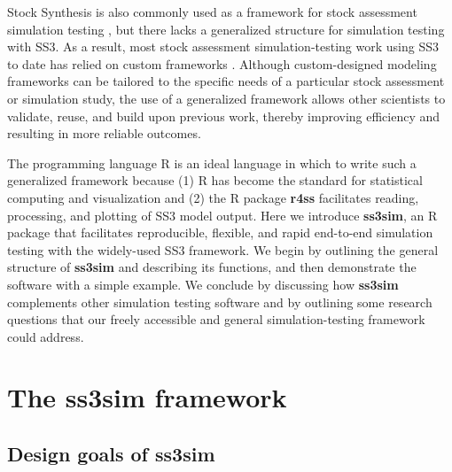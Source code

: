 \documentclass[11pt]{article}
\begin{document}
\begin{spacing}{1.2}
Stock Synthesis is also commonly used as a framework for stock assessment
simulation testing \cite{helu2000, yin2004, schirripa2009, lee2011, jiao2012,
  lee2012, crone2013a, hurtadoferro2013}, but there lacks a generalized
structure for simulation testing with SS3. As a result, most stock
assessment simulation-testing work using SS3 to date has relied on custom
frameworks \cite{helu2000, yin2004, magnusson2007, wetzel2011a, jiao2012,
  wilberg2006, deroba2013, deroba2014, crone2013a, hurtadoferro2013}.
Although custom-designed modeling frameworks can be tailored to the
specific needs of a particular stock assessment or simulation study, the use of
a generalized framework allows other scientists to validate, reuse, and build
upon previous work, thereby improving efficiency and resulting in more reliable
outcomes.

The programming language \textsf{R} \cite{rcoreteam2013} is an ideal language
in which to write such a generalized framework because (1) \textsf{R} has
become the standard for statistical computing and visualization and (2) the
\textsf{R} package \textbf{r4ss} \cite{r4ss2013} facilitates reading,
processing, and plotting of SS3 model output. Here we introduce
\textbf{ss3sim}, an \textsf{R} package that facilitates reproducible,
flexible, and rapid end-to-end simulation testing with the widely-used SS3
framework. We begin by outlining the general structure of \textbf{ss3sim} and
describing its functions, and then demonstrate the software with a simple
example. We conclude by discussing how \textbf{ss3sim} complements other
simulation testing software and by outlining some research questions that our
freely accessible and general simulation-testing framework could address.

\section*{The ss3sim framework}

\subsection*{Design goals of ss3sim}


\end{spacing}
\end{document}
